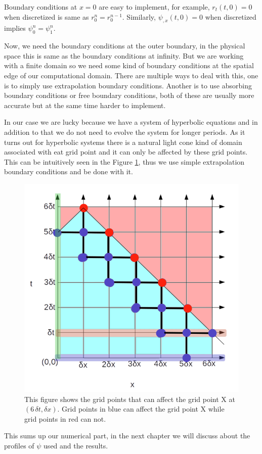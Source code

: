 Boundary conditions at $x=0$ are easy to implement, for example, $r_t(t,0) = 0$ when discretized is same as $r^{n}_0 = r^{n-1}_0$. Similarly, $\psi_{,x}(t,0) = 0 $ when discretized implies $\psi^{n}_0 = \psi^{n}_1$.

Now, we need the boundary conditions at the outer boundary, in the physical space this is same as the boundary conditions at infinity. But we are working with a finite domain so we need some kind of boundary conditions at the spatial edge of our computational domain. There are multiple ways to deal with this, one is to simply use extrapolation boundary conditions. Another is to use absorbing boundary conditions or free boundary conditions, both of these are usually more accurate but at the same time harder to implement.

In our case we are lucky because we have a system of hyperbolic equations and in addition to that we do not need to evolve the system for longer periods.
As it turns out for hyperbolic systems there is a natural light cone kind of domain associated with eat grid point and it can only be affected by these grid points.
This can be intuitively seen in the Figure \ref{fig:grid_outer_boundary_conditions}, thus we use simple extrapolation boundary conditions and be done with it.

\begin{figure}[hbt!]
    \centering
    \includegraphics[width=\textwidth]{images/grid_outer_boundary_condition.png}
    \caption{This figure shows the grid points that can affect the grid point X at $(6 \,\delta t, \delta x)$. Grid points in blue can affect the grid point X while grid points in red can not.}
    \label{fig:grid_outer_boundary_conditions}
\end{figure}


This sums up our numerical part, in the next chapter we will discuss about the profiles of $\psi$ used and the results.